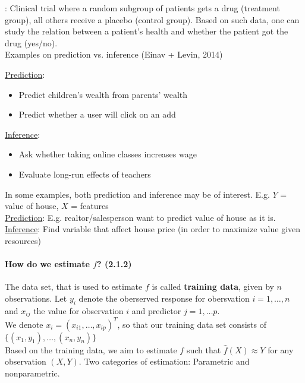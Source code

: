 \documentclass[11pt,a4paper,numbers=endperiod]{scrartcl}
\newcommand{\tit}[1]{\begin{large} \underline{\text{#1}}\end{large}}
\begin{document}
\tit{Example}: Clinical trial where a random subgroup of patients gets a drug (treatment group), all others receive a placebo (control group). Based on such data, one can study the relation between a patient's health and whether the patient got the drug (yes/no).\\

Examples on prediction vs. inference (Einav + Levin, 2014)

\underline{Prediction}: 
\begin{itemize}[label={--}]
	\item Predict children's wealth from parents' wealth
	\item Predict whether a user will click on an add
\end{itemize}

\underline{Inference}:
\begin{itemize}[label={--}]
	\item Ask whether taking online classes increases wage
	\item Evaluate long-run effects of teachers
\end{itemize}

In some examples, both prediction and inference may be of interest. E.g. $Y$ = value of house, $X$ = features\\

\indent \underline{Prediction}: E.g. realtor/salesperson want to predict value of house as it is.\\
\indent \underline{Inference}: Find variable that affect house price (in order to maximize value given resources)

\paragraph{How do we estimate $f$? (2.1.2)}
$ $\\ 

The data set, that is used to estimate $f$ is called \textbf{training data}, given by $n$ observations. Let $y_i$ denote the oberserved response for obersvation $i = 1, \ldots, n$ and $x_{ij}$ the value for observation $i$ and predictor $j = 1, \ldots p$.\\
We denote $x_i= (x_{i1}, \ldots, x_{ip})^T$, so that our training data set consists of $\{(x_1, y_1), \ldots, (x_n, y_n)\}$\\

Based on the training data, we aim to estimate $f$ such that $\hat{f}(X) \approx Y$ for any observation $(X, Y)$. Two categories of estimation: Parametric and nonparametric.\\
\end{document}
